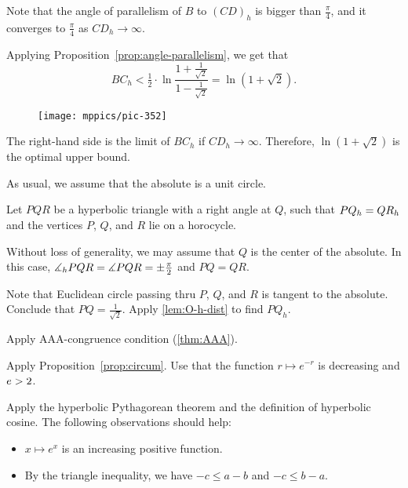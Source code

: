 Note that the angle of parallelism of $B$ to $(CD)_h$ is bigger than $\tfrac\pi4$,
and it converges to $\tfrac\pi4$ as $CD_h\to\infty$.

Applying Proposition~\ref{prop:angle-parallelism},
we get that
$$BC_h<\tfrac12\cdot\ln\frac{1+\frac1{\sqrt{2}}}{1-\frac1{\sqrt{2}}}=\ln\left(1+\sqrt{2}\right).$$

{

\begin{wrapfigure}{r}{45mm}
\vskip-4mm
\centering
\texttt{[image: mppics/pic-352]}
\end{wrapfigure}

The right-hand side is the limit of $BC_h$ if $CD_h\to\infty$.
Therefore, $\ln\left(1+\sqrt{2}\right)$ is the optimal upper bound.

As usual, we assume that the absolute is a unit circle.

Let $PQR$ be a hyperbolic triangle
with a right angle at $Q$, such that $PQ_h\z=QR_h$
and the vertices $P$, $Q$, and $R$ 
lie on a horocycle.

Without loss of generality, we may assume that $Q$ is the center of the absolute.
In this case, $\measuredangle_hPQR\z=\measuredangle PQR\z=\pm\tfrac\pi2$ and $PQ=QR$.

}

Note that Euclidean circle passing thru $P$, $Q$, and $R$ is tangent to the absolute.
Conclude that $PQ=\tfrac1{\sqrt2}$. 
Apply \ref{lem:O-h-dist} to find $PQ_h$.


Apply AAA-congruence condition (\ref{thm:AAA}).

Apply Proposition~\ref{prop:circum}.
Use that the function $r\mapsto e^{-r}$ is decreasing and $e\z>2$.

Apply the hyperbolic Pythagorean theorem and the definition of hyperbolic cosine.
The following observations should help:
\begin{itemize}
 \item $x\mapsto e^x$ is an increasing positive function.
 \item By the triangle inequality,  we have $-c\le a-b$ and $-c\le b-a$.
\end{itemize}


\setcounter{eqtn}{0}

